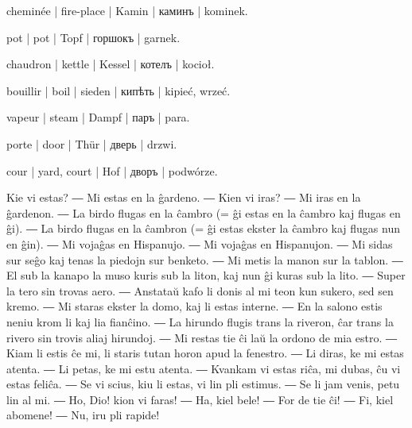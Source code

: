 \begin{ekzvocab}{1em}
 cheminée | fire-place | Kamin | каминъ | kominek.

 pot | pot | Topf | горшокъ | garnek.

 chaudron | kettle | Kessel | котелъ | kocioł.

 bouillir | boil | sieden | кипѣть | kipieć, wrzeć.

 vapeur | steam | Dampf | паръ | para.

 porte | door | Thür | дверь | drzwi.

 cour | yard, court | Hof | дворъ | podwórze.

\end{ekzvocab}



Kie vi estas? ― Mi estas en la ĝardeno. ― Kien vi iras? ― Mi iras en la ĝardenon. ― La birdo flugas en la ĉambro (= ĝi estas en la ĉambro kaj flugas en ĝi). ― La birdo flugas en la ĉambron (= ĝi estas ekster la ĉambro kaj flugas nun en ĝin). ― Mi vojaĝas en Hispanujo. ― Mi vojaĝas en Hispanujon. ― Mi sidas sur seĝo kaj tenas la piedojn sur benketo. ― Mi metis la manon sur la tablon. ― El sub la kanapo la muso kuris sub la liton, kaj nun ĝi kuras sub la lito. ― Super la tero sin trovas aero. ― Anstataŭ kafo li donis al mi teon kun sukero, sed sen kremo. ― Mi staras ekster la domo, kaj li estas interne. ― En la salono estis neniu krom li kaj lia fianĉino. ― La hirundo flugis trans la riveron, ĉar trans la rivero sin trovis aliaj hirundoj. ― Mi restas tie ĉi laŭ la ordono de mia estro. ― Kiam li estis ĉe mi, li staris tutan horon apud la fenestro. ― Li diras, ke mi estas atenta. ― Li petas, ke mi estu atenta. ― Kvankam vi estas riĉa, mi dubas, ĉu vi estas feliĉa. ― Se vi scius, kiu li estas, vi lin pli estimus. ― Se li jam venis, petu lin al mi. ― Ho, Dio! kion vi faras! ― Ha, kiel bele! ― For de tie ĉi! ― Fi, kiel abomene! ― Nu, iru pli rapide!

